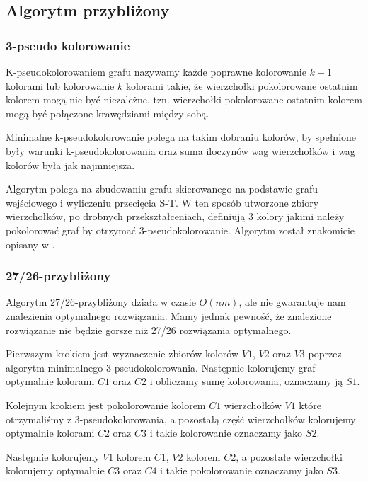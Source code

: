 \documentclass{article}
\begin{document}
\subsection{Algorytm przybliżony}

\subsubsection*{3-pseudo kolorowanie}

K-pseudokolorowaniem grafu nazywamy każde poprawne kolorowanie $k-1$ kolorami lub kolorowanie $k$ kolorami takie, że wierzchołki pokolorowane ostatnim kolorem mogą nie być niezależne, tzn. wierzchołki pokolorowane ostatnim kolorem mogą być połączone krawędziami między sobą. 

Minimalne k-pseudokolorowanie polega na takim dobraniu kolorów, by spełnione były warunki k-pseudokolorowania oraz suma iloczynów wag wierzchołków i wag kolorów była jak najmniejsza.

Algorytm polega na zbudowaniu grafu skierowanego na podstawie grafu wejściowego i wyliczeniu przecięcia S-T. W ten sposób utworzone zbiory wierzchołków, po drobnych przekształceniach, definiują 3 kolory jakimi należy pokolorować graf by otrzymać 3-pseudokolorowanie. Algorytm został znakomicie opisany w \cite{kubale-pikies19}.

\subsubsection*{27/26-przybliżony}

Algorytm 27/26-przybliżony działa w czasie $O(nm)$, ale nie gwarantuje nam znalezienia optymalnego rozwiązania. Mamy jednak pewność, że znalezione rozwiązanie nie będzie gorsze niż 27/26 rozwiązania optymalnego. 

Pierwszym krokiem jest wyznaczenie zbiorów kolorów $V1$, $V2$ oraz $V3$ poprzez algorytm minimalnego 3-pseudokolorowania. Następnie kolorujemy graf optymalnie kolorami $C1$ oraz $C2$ i obliczamy sumę kolorowania, oznaczamy ją $S1$. 

Kolejnym krokiem jest pokolorowanie kolorem $C1$ wierzchołków $V1$ które otrzymaliśmy z 3-pseudokolorowania, a pozostałą część wierzchołków kolorujemy optymalnie kolorami $C2$ oraz $C3$ i takie kolorowanie oznaczamy jako $S2$.

Następnie kolorujemy $V1$ kolorem $C1$, $V2$ kolorem $C2$, a pozostałe wierzchołki kolorujemy optymalnie $C3$ oraz $C4$ i takie pokolorowanie oznaczamy jako $S3$.
\end{document}
